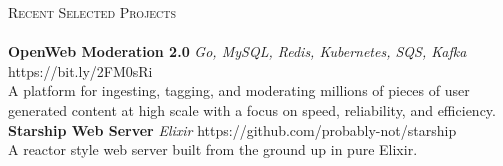 \documentclass[a4paper]{article}
\newcommand{\lineunder} {
    \vspace*{-8pt} \\
    \hspace*{-18pt} \hrulefill \\
}
\newcommand{\header} [1] {
    {\hspace*{-18pt}\vspace*{6pt} \textsc{#1}}
    \vspace*{-6pt} \lineunder
}
\begin{document}
\header{Recent Selected Projects}
{\textbf{OpenWeb Moderation 2.0}} {\sl Go, MySQL, Redis, Kubernetes, SQS, Kafka} \hfill https://bit.ly/2FM0sRi\\
A platform for ingesting, tagging, and moderating millions of pieces of user generated content at high scale with a focus on speed, reliability, and efficiency.\\
\vspace*{2mm}
{\textbf{Starship Web Server}} {\sl Elixir} \hfill https://github.com/probably-not/starship\\
A reactor style web server built from the ground up in pure Elixir.\\
\vspace*{2mm}



\ 
\end{document}
